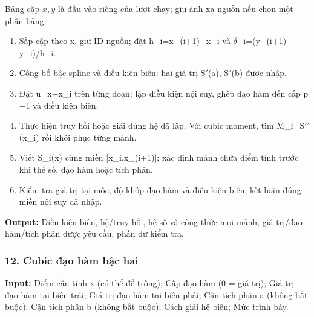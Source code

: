 Bảng cặp $x,y$ là đầu vào riêng của lượt chạy; giữ ánh xạ nguồn nếu chọn một phần bảng.

\begin{enumerate}

\item Sắp cặp theo x,\allowbreak{} giữ ID nguồn;\allowbreak{} đặt h\_i=\allowbreak{}x\_(\allowbreak{}i+\allowbreak{}1)\ensuremath{-}x\_i và \ensuremath{\delta}\_i=\allowbreak{}(\allowbreak{}y\_(\allowbreak{}i+\allowbreak{}1)\ensuremath{-}y\_i)/\allowbreak{}h\_i.

\item Công bố bậc spline và điều kiện biên: hai giá trị S\ensuremath{\prime}(\allowbreak{}a),\allowbreak{} S\ensuremath{\prime}(\allowbreak{}b) được nhập.

\item Đặt u=\allowbreak{}x\ensuremath{-}x\_i trên từng đoạn;\allowbreak{} lập điều kiện nội suy,\allowbreak{} ghép đạo hàm đến cấp p\ensuremath{-}1 và điều kiện biên.

\item Thực hiện truy hồi hoặc giải đúng hệ đã lập. Với cubic moment,\allowbreak{} tìm M\_i=\allowbreak{}S\ensuremath{\prime\prime}(\allowbreak{}x\_i) rồi khôi phục từng mảnh.

\item Viết S\_i(\allowbreak{}x) cùng miền [x\_i,\allowbreak{}x\_(\allowbreak{}i+\allowbreak{}1)];\allowbreak{} xác định mảnh chứa điểm tính trước khi thế số,\allowbreak{} đạo hàm hoặc tích phân.

\item Kiểm tra giá trị tại mốc,\allowbreak{} độ khớp đạo hàm và điều kiện biên;\allowbreak{} kết luận đúng miền nội suy đã nhập.

\end{enumerate}

\textbf{Output:} Điều kiện biên,\allowbreak{} hệ/\allowbreak{}truy hồi,\allowbreak{} hệ số và công thức mọi mảnh,\allowbreak{} giá trị/\allowbreak{}đạo hàm/\allowbreak{}tích phân được yêu cầu,\allowbreak{} phần dư kiểm tra.

\examplebreak\subsubsection*{12. Cubic đạo hàm bậc hai}

\textbf{Input:} Điểm cần tính x (\allowbreak{}có thể để trống);\allowbreak{} Cấp đạo hàm (\allowbreak{}0 =\allowbreak{} giá trị);\allowbreak{} Giá trị đạo hàm tại biên trái;\allowbreak{} Giá trị đạo hàm tại biên phải;\allowbreak{} Cận tích phân a (\allowbreak{}không bắt buộc);\allowbreak{} Cận tích phân b (\allowbreak{}không bắt buộc);\allowbreak{} Cách giải hệ biên;\allowbreak{} Mức trình bày.

